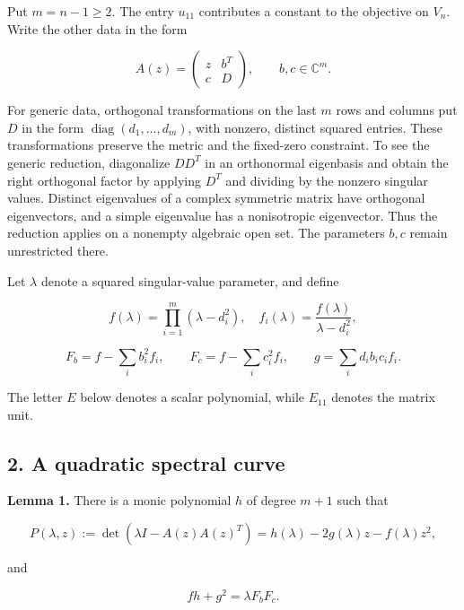 \documentclass[10pt,a4paper]{article}
\begin{document}
Put \(m=n-1\ge2\). The entry \(u_{11}\) contributes a constant to the
objective on \(V_n\). Write the other data in the form

\nopagebreak[4]

\[A(z)=\begin{pmatrix}z&b^T\\c&D\end{pmatrix},\qquad b,c\in\mathbb C^m.\]

For generic data, orthogonal transformations on the last \(m\) rows and
columns put \(D\) in the form \(\operatorname{diag}(d_1,\ldots,d_m)\),
with nonzero, distinct squared entries. These transformations preserve
the metric and the fixed-zero constraint. To see the generic reduction,
diagonalize \(DD^T\) in an orthonormal eigenbasis and obtain the right
orthogonal factor by applying \(D^T\) and dividing by the nonzero
singular values. Distinct eigenvalues of a complex symmetric matrix have
orthogonal eigenvectors, and a simple eigenvalue has a nonisotropic
eigenvector. Thus the reduction applies on a nonempty algebraic open
set. The parameters \(b,c\) remain unrestricted there.

Let \(\lambda\) denote a squared singular-value parameter, and define

\nopagebreak[4]

\[f(\lambda)=\prod_{i=1}^m(\lambda-d_i^2),\quad
f_i(\lambda)=\frac{f(\lambda)}{\lambda-d_i^2},\]

\nopagebreak[4]

\[F_b=f-\sum_i b_i^2f_i,\qquad
F_c=f-\sum_i c_i^2f_i,\qquad
g=\sum_i d_i b_i c_i f_i.\]

The letter \(E\) below denotes a scalar polynomial, while \(E_{11}\)
denotes the matrix unit.


\subsection{2. A quadratic spectral
curve}\label{a-quadratic-spectral-curve}

\textbf{Lemma 1.} There is a monic polynomial \(h\) of degree \(m+1\)
such that

\nopagebreak[4]

\[P(\lambda,z):=\det(\lambda I-A(z)A(z)^T)
=h(\lambda)-2g(\lambda)z-f(\lambda)z^2,\tag{1}\]

and

\nopagebreak[4]

\[f h+g^2=\lambda F_bF_c.\tag{2}\]
\end{document}
